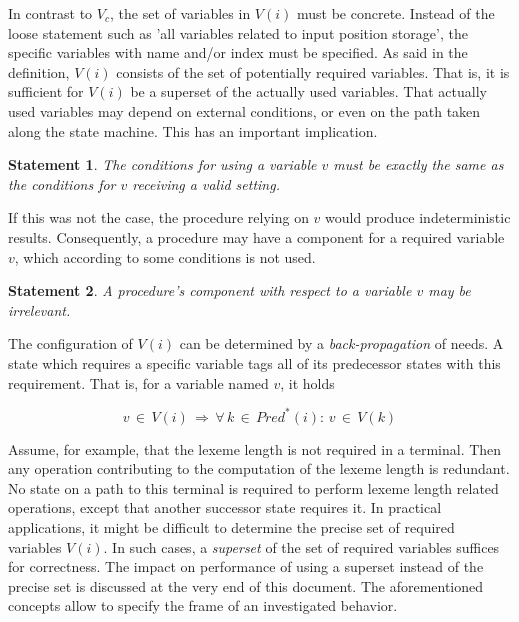 \documentclass[12pt,a4paper]{scrartcl}
\newtheorem{statement}{Statement}
\begin{document}
In contrast to $V_c$, the set of variables in $V(i)$ must be concrete.  Instead
of the loose statement such as 'all variables related to input position
storage', the specific variables with name and/or index must be specified.  As
said in the definition, $V(i)$ consists of the set of potentially required
variables. That is, it is sufficient for $V(i)$ be a superset of the actually
used variables. That actually used variables may depend on external conditions,
or even on the path taken along the state machine. This has an important
implication. 

\begin{statement}
    The conditions for using a variable $v$ must be exactly the same as the
    conditions for $v$ receiving a valid setting. 
\end{statement}

If this was not the case, the procedure relying on $v$ would produce
indeterministic results. Consequently, a procedure may have a component for a
required variable $v$, which according to some conditions is not used.

\begin{statement}
    A procedure's component with respect to a variable $v$ may be irrelevant.
\end{statement}

The configuration of $V(i)$ can be determined by a \textit{back-propagation} of
needs. A state which requires a specific variable tags all of its predecessor
states with this requirement. That is, for a variable named $v$, it holds

\begin{equation}
    v\,\in\,V(i)\,\Rightarrow\,\forall\,k\,\in\,Pred^*(i):\,v\,\in\,V(k)
\end{equation}

Assume, for example, that the lexeme length is not required in a terminal. Then
any operation contributing to the computation of the lexeme length is
redundant.  No state on a path to this terminal is required to perform lexeme
length related operations, except that another successor state requires it.  In
practical applications, it might be difficult to determine the precise set of
required variables $V(i)$. In such cases, a \textit{superset} of the set of
required variables suffices for correctness. The impact on performance of using
a superset instead of the precise set is discussed at the very end of this
document.  The aforementioned concepts allow to specify the frame of an
investigated behavior.  
\end{document}
